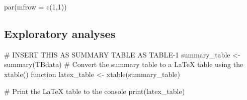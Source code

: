\documentclass[
  letterpaper,
  DIV=11,
  numbers=noendperiod]{scrartcl}
\newenvironment{Shaded}{\begin{snugshade}}{\end{snugshade}}
\newcommand{\AttributeTok}[1]{\textcolor[rgb]{0.40,0.45,0.13}{#1}}
\newcommand{\CommentTok}[1]{\textcolor[rgb]{0.37,0.37,0.37}{#1}}
\newcommand{\DecValTok}[1]{\textcolor[rgb]{0.68,0.00,0.00}{#1}}
\newcommand{\FunctionTok}[1]{\textcolor[rgb]{0.28,0.35,0.67}{#1}}
\newcommand{\NormalTok}[1]{\textcolor[rgb]{0.00,0.23,0.31}{#1}}
\newcommand{\OtherTok}[1]{\textcolor[rgb]{0.00,0.23,0.31}{#1}}
\begin{document}
\begin{Shaded}
\begin{Highlighting}[]
\FunctionTok{par}\NormalTok{(}\AttributeTok{mfrow =} \FunctionTok{c}\NormalTok{(}\DecValTok{1}\NormalTok{,}\DecValTok{1}\NormalTok{))}
\end{Highlighting}
\end{Shaded}

\hypertarget{exploratory-analyses}{%
\subsection{Exploratory analyses}\label{exploratory-analyses}}

\begin{Shaded}
\begin{Highlighting}[]
\CommentTok{\# INSERT THIS AS SUMMARY TABLE AS TABLE{-}1}
\NormalTok{summary\_table }\OtherTok{\textless{}{-}} \FunctionTok{summary}\NormalTok{(TBdata)}
\CommentTok{\# Convert the summary table to a LaTeX table using the xtable() function}
\NormalTok{latex\_table }\OtherTok{\textless{}{-}} \FunctionTok{xtable}\NormalTok{(summary\_table)}

\CommentTok{\# Print the LaTeX table to the console}
\FunctionTok{print}\NormalTok{(latex\_table)}
\end{Highlighting}
\end{Shaded}
\end{document}
